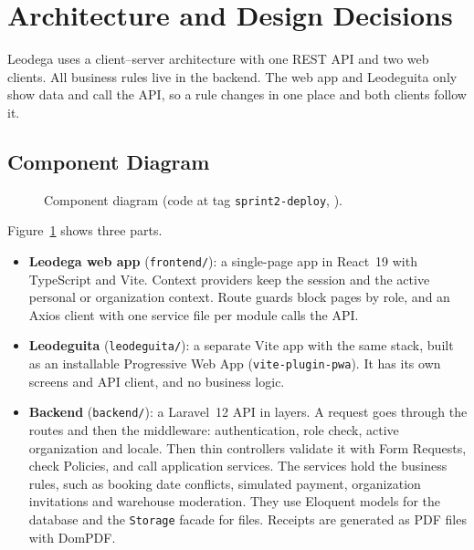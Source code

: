 \section{Architecture and Design Decisions}
\label{sec:architecture}

Leodega uses a client--server architecture with one REST API and two web clients.
All business rules live in the backend.
The web app and Leodeguita only show data and call the API, so a rule changes in one place and both clients follow it.

\subsection{Component Diagram}

\begin{figure}[H]
  \centering
  \resizebox{\linewidth}{!}{}
  \caption{Component diagram (code at tag \texttt{sprint2-deploy}, ).}
  \label{fig:components}
\end{figure}

Figure~\ref{fig:components} shows three parts.

\begin{itemize}
  \item \textbf{Leodega web app} (\texttt{frontend/}): a single-page app in React~19 with TypeScript and Vite.
        Context providers keep the session and the active personal or organization context.
        Route guards block pages by role, and an Axios client with one service file per module calls the API\@.
  \item \textbf{Leodeguita} (\texttt{leodeguita/}): a separate Vite app with the same stack, built as an installable Progressive Web App (\texttt{vite-plugin-pwa}).
        It has its own screens and API client, and no business logic.
  \item \textbf{Backend} (\texttt{backend/}): a Laravel~12 API in layers.
        A request goes through the routes and then the middleware: authentication, role check, active organization and locale.
        Then thin controllers validate it with Form Requests, check Policies, and call application services.
        The services hold the business rules, such as booking date conflicts, simulated payment, organization invitations and warehouse moderation.
        They use Eloquent models for the database and the \texttt{Storage} facade for files.
        Receipts are generated as PDF files with DomPDF\@.
\end{itemize}


